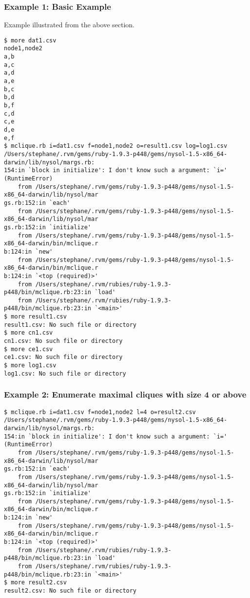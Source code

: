 \subsubsection*{Example 1: Basic Example}

Example illustrated from the above section.


\begin{Verbatim}[baselinestretch=0.7,frame=single]
$ more dat1.csv
node1,node2
a,b
a,c
a,d
a,e
b,c
b,d
b,f
c,d
c,e
d,e
e,f
$ mclique.rb i=dat1.csv f=node1,node2 o=result1.csv log=log1.csv
/Users/stephane/.rvm/gems/ruby-1.9.3-p448/gems/nysol-1.5-x86_64-darwin/lib/nysol/margs.rb:
154:in `block in initialize': I don't know such a argument: `i=' (RuntimeError)
	from /Users/stephane/.rvm/gems/ruby-1.9.3-p448/gems/nysol-1.5-x86_64-darwin/lib/nysol/mar
gs.rb:152:in `each'
	from /Users/stephane/.rvm/gems/ruby-1.9.3-p448/gems/nysol-1.5-x86_64-darwin/lib/nysol/mar
gs.rb:152:in `initialize'
	from /Users/stephane/.rvm/gems/ruby-1.9.3-p448/gems/nysol-1.5-x86_64-darwin/bin/mclique.r
b:124:in `new'
	from /Users/stephane/.rvm/gems/ruby-1.9.3-p448/gems/nysol-1.5-x86_64-darwin/bin/mclique.r
b:124:in `<top (required)>'
	from /Users/stephane/.rvm/rubies/ruby-1.9.3-p448/bin/mclique.rb:23:in `load'
	from /Users/stephane/.rvm/rubies/ruby-1.9.3-p448/bin/mclique.rb:23:in `<main>'
$ more result1.csv
result1.csv: No such file or directory
$ more cn1.csv
cn1.csv: No such file or directory
$ more ce1.csv
ce1.csv: No such file or directory
$ more log1.csv
log1.csv: No such file or directory
\end{Verbatim}
\subsubsection*{Example 2: Enumerate maximal cliques with size 4 or above}



\begin{Verbatim}[baselinestretch=0.7,frame=single]
$ mclique.rb i=dat1.csv f=node1,node2 l=4 o=result2.csv
/Users/stephane/.rvm/gems/ruby-1.9.3-p448/gems/nysol-1.5-x86_64-darwin/lib/nysol/margs.rb:
154:in `block in initialize': I don't know such a argument: `i=' (RuntimeError)
	from /Users/stephane/.rvm/gems/ruby-1.9.3-p448/gems/nysol-1.5-x86_64-darwin/lib/nysol/mar
gs.rb:152:in `each'
	from /Users/stephane/.rvm/gems/ruby-1.9.3-p448/gems/nysol-1.5-x86_64-darwin/lib/nysol/mar
gs.rb:152:in `initialize'
	from /Users/stephane/.rvm/gems/ruby-1.9.3-p448/gems/nysol-1.5-x86_64-darwin/bin/mclique.r
b:124:in `new'
	from /Users/stephane/.rvm/gems/ruby-1.9.3-p448/gems/nysol-1.5-x86_64-darwin/bin/mclique.r
b:124:in `<top (required)>'
	from /Users/stephane/.rvm/rubies/ruby-1.9.3-p448/bin/mclique.rb:23:in `load'
	from /Users/stephane/.rvm/rubies/ruby-1.9.3-p448/bin/mclique.rb:23:in `<main>'
$ more result2.csv
result2.csv: No such file or directory
\end{Verbatim}
